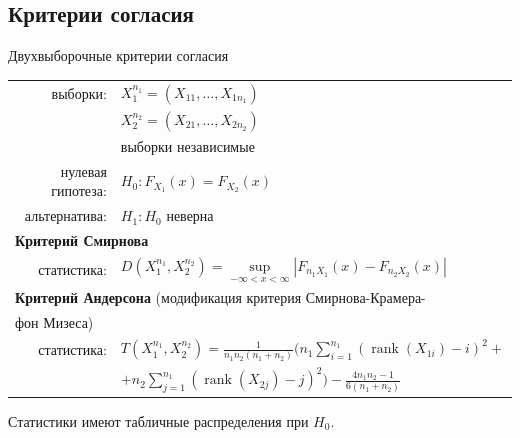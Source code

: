 \documentclass[9pt,pdf,utf8,hyperref={unicode},aspectratio=169]{beamer}
\DeclareMathOperator{\rank}{rank}
\begin{document}
\subsection{Критерии согласия}
\begin{frame}{Двухвыборочные критерии согласия}
   \begin{center}	
     \begin{tabular}{rl}
         выборки:                        & $X_1^{n_1}=\left(X_{11},\ldots,X_{1n_1}\right)$ \\
                                         & $X_2^{n_2}=\left(X_{21},\ldots,X_{2n_2}\right)$ \\
                                         & выборки независимые \\
         нулевая гипотеза:               & $H_0\colon F_{X_1} \left(x\right) = F_{X_2} \left(x\right)$ \\
         альтернатива:                   & $H_1\colon H_0$ неверна \bigskip \\
         \multicolumn{2}{l}{\textbf{Критерий Смирнова}}\\
         статистика:                        & $D\left(X_1^{n_1}, X_2^{n_2}\right) = \sup\limits_{-\infty<x<\infty} \left|F_{n_1X_1} \left(x\right) - F_{n_2 X_2} \left(x\right)\right|$  \bigskip \\
         \multicolumn{2}{l}{\textbf{Критерий Андерсона} (модификация критерия Смирнова-Крамера-}\\
         \multicolumn{2}{l}{фон Мизеса)}\\
         статистика:                        & $T\left(X_1^{n_1}, X_2^{n_2}\right) = \frac1{n_1n_2\left(n_1+n_2\right)} \Biggl( n_1\sum\limits_{i=1}^{n_1} \left(\rank\left(X_{1i}\right) - i\right)^2 + $\\
                                            & \;\;\; $ + n_2 \sum\limits_{j=1}^{n_1} \left(\rank\left(X_{2j}\right) - j\right)^2 \Biggr) - \frac{4n_1n_2-1}{6\left(n_1+n_2\right)}$
     \end{tabular}
 \end{center}

 \bigskip

 Статистики имеют табличные распределения при $H_0$.
\end{frame}
\end{document}
